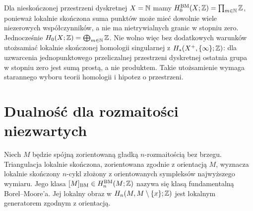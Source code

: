 \begin{przyklad}
Dla nieskończonej przestrzeni dyskretnej $X=\mathbb{N}$
mamy $H_0^{\mathrm{BM}}(X;\mathbb{Z})=\prod_{m\in\mathbb{N}}\mathbb{Z}$,
ponieważ lokalnie skończona suma punktów może mieć
dowolnie wiele niezerowych współczynników, a nie
ma nietrywialnych granic w stopniu zero.
Jednocześnie $H_0(X;\mathbb{Z})=\bigoplus_{m\in\mathbb{N}}\mathbb{Z}$.
Nie wolno więc bez dodatkowych warunków utożsamiać
lokalnie skończonej homologii singularnej z
$H_*(X^+,\{\infty\};\mathbb{Z})$: dla uzwarcenia
jednopunktowego przeliczalnej przestrzeni dyskretnej
ostatnia grupa w stopniu zero jest sumą prostą,
a nie produktem. Takie utożsamienie wymaga starannego
wyboru teorii homologii i hipotez o przestrzeni.
\end{przyklad}

\section{Dualność dla rozmaitości niezwartych}
\begin{definicja}
Niech $M$ będzie spójną zorientowaną gładką
$n$-rozmaitością bez brzegu. Triangulacja lokalnie
skończona, zorientowana zgodnie z orientacją $M$,
wyznacza lokalnie skończony $n$-cykl złożony z
orientowanych sympleksów najwyższego wymiaru.
Jego klasa $[M]_{\mathrm{BM}}\in H_n^{\mathrm{BM}}(M;\mathbb{Z})$
nazywa się klasą fundamentalną Borel--Moore'a.
Jej lokalny obraz w $H_n(M,M\setminus\{x\};\mathbb{Z})$
jest lokalnym generatorem zgodnym z orientacją.
\end{definicja}

